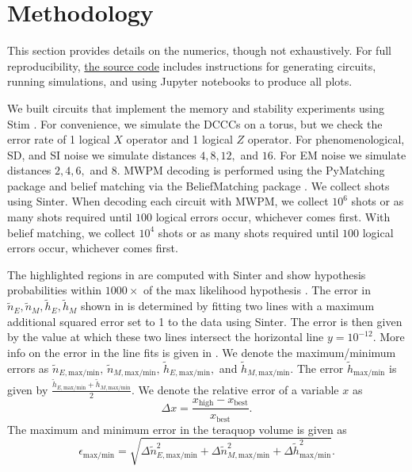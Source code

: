 \section{Methodology}
\label{sec:methodology}

This section provides details on the numerics, though not exhaustively. For full reproducibility,  \href{https://github.com/peter-janderks/floquet_colour_codes_numerics}{the source code} includes instructions for generating circuits, running simulations, and using Jupyter notebooks to produce all plots.

We built circuits that implement the memory and stability experiments using Stim \cite{Gidney2021stimfaststabilizer}. 
For convenience, we simulate the DCCCs on a torus, but we check the error rate of 1 logical $X$ operator and 1 logical $Z$ operator.
For phenomenological, SD, and SI noise we simulate distances $4,8,12,$ and $16$.
For EM noise we simulate distances $2,4,6,$ and $8$.
MWPM decoding is performed using the PyMatching package \cite{higgott2025sparse} and belief matching via the 
BeliefMatching package \cite{higgott2022fragile,higgott_beliefmatching_2023}. 
We collect shots using Sinter.
When decoding each circuit with MWPM, we collect $10^6$ shots or as many shots required until $100$ logical errors occur, whichever comes first.
With belief matching, we collect $10^4$ shots  or as many shots required until $100$ logical errors occur, whichever comes first.

The highlighted regions in  are computed with Sinter and show hypothesis probabilities within $1000 \times$ of 
the max likelihood hypothesis \cite{AG47_2024}.
The error in $\tilde{n}_E, \tilde{n}_M, \tilde{h}_E, \tilde{h}_M$ shown in  is determined by fitting two lines with a maximum additional squared error set to 1 to the data using Sinter.
The error is then given by the value at which these two lines intersect the horizontal line $y=10^{-12}$. 
More info on the error in the line fits is given in .
We denote the maximum/minimum errors as $\tilde{n}_{E,\text{max/min}}, \, \tilde{n}_{M,\text{max/min}}, \, \tilde{h}_{E,\text{max/min}}, $ and $\tilde{h}_{M,\text{max/min}}$.
The error $\tilde{h}_{\text{max/min}}$ is given by $\frac{\tilde{h}_{E,\text{max/min}} + \tilde{h}_{M,\text{max/min}}}{2}$.
We denote the relative error of a variable $x$ as 
\begin{equation}\Delta x =  \frac{x_\text{high} - x_\text{best}}{x_\text{best}}.
\end{equation}
The maximum and minimum error in the teraquop volume is given as
\begin{equation}
\epsilon_{\text{max/min}} = \sqrt{ \Delta \tilde{n}_{E,\text{max/min}}^2 + \Delta\tilde{n}_{M,\text{max/min}}^2 + \Delta \tilde{h}_{\text{max/min}}^2}.
\end{equation}
